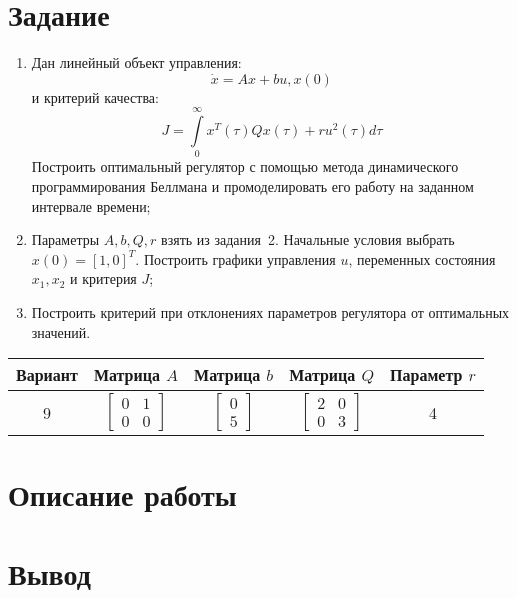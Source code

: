 \documentclass[14pt, a4paper]{extarticle}
\begin{document}
	\onehalfspacing
	
	\setcounter{page}{2}
	
	\section*{Задание}
	
	\begin{enumerate}
		\item Дан линейный объект управления:
		$$\dot{x}=Ax+bu, x(0)$$
		и критерий качества:
		$$J = \int\limits_0^\infty x^T(\tau)Qx(\tau) + ru^2(\tau)d\tau$$
		Построить оптимальный регулятор с помощью метода динамического программирования Беллмана и промоделировать его работу на заданном интервале времени;
		\item Параметры $A,b,Q,r$ взять из задания~2. Начальные условия выбрать $x(0)=[1, 0]^T$. Построить графики управления $u$, переменных состояния $x_1,x_2$ и критерия $J$;
		\item Построить критерий при отклонениях параметров регулятора от оптимальных значений.
	\end{enumerate}
	\begin{table}[H]
		\centering
		\begin{tabular}{|c|c|c|c|c|}
			\hline
			Вариант & Матрица $A$ & Матрица $b$ & Матрица $Q$ & Параметр $r$ \\\hline
			9 & 
			$\left[
			\begin{matrix}
				0 & 1 \\
				0 & 0 
			\end{matrix}
			\right]$
			& 
			$\left[
			\begin{matrix}
				0 \\ 5
			\end{matrix}
			\right]$
			& 
			$\left[
			\begin{matrix}
				2 & 0 \\
				0 & 3 
			\end{matrix}
			\right]$
			& 4 \\\hline
		\end{tabular}
	\end{table}
	
	\newpage
	
	\section*{Описание работы}
	
	
	
	\newpage
	
	\section*{Вывод}
	
\end{document}
